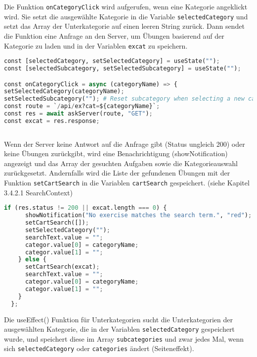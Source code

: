 Die Funktion \texttt{onCategoryClick} wird aufgerufen, wenn eine Kategorie angeklickt wird. Sie setzt die ausgewählte Kategorie in die Variable \texttt{selectedCategory} und setzt das Array der Unterkategorie auf einen leeren String zurück. Dann sendet die Funktion eine Anfrage an den Server, um Übungen basierend auf der Kategorie zu laden und in der Variablen \texttt{excat} zu speichern.

\begin{lstlisting}[language=Python]
const [selectedCategory, setSelectedCategory] = useState("");
const [selectedSubcategory, setSelectedSubcategory] = useState("");

const onCategoryClick = async (categoryName) => {
setSelectedCategory(categoryName);
setSelectedSubcategory(""); # Reset subcategory when selecting a new category
const route = `/api/ex?cat=${categoryName}`;
const res = await askServer(route, "GET");
const excat = res.response;
    
\end{lstlisting}

 Wenn der Server keine Antwort auf die Anfrage gibt (Status ungleich 200) oder keine Übungen zurückgibt, wird eine Benachrichtigung (showNotification) angezeigt und das Array der gesuchten Aufgaben sowie die Kategorieauswahl zurückgesetzt. Andernfalls wird die Liste der gefundenen Übungen mit der Funktion \texttt{setCartSearch} in die Variablen \texttt{cartSearch} gespeichert. (siehe Kapitel 3.4.2.1 SearchContext)

\newpage
\begin{lstlisting}[language=Python]
    if (res.status != 200 || excat.length === 0) {
      showNotification("No exercise matches the search term.", "red");
      setCartSearch([]);
      setSelectedCategory("");
      searchText.value = "";
      categor.value[0] = categoryName;
      categor.value[1] = "";
    } else {
      setCartSearch(excat);
      searchText.value = "";
      categor.value[0] = categoryName;
      categor.value[1] = "";
    }
  };


\end{lstlisting}



Die useEffect() Funktion für Unterkategorien sucht die Unterkategorien der ausgewählten Kategorie, die in der Variablen \texttt{selectedCategory} gespeichert wurde, und speichert diese im Array \texttt{subcategories} und zwar jedes Mal, wenn sich \texttt{selectedCategory} oder \texttt{categories} ändert (Seiteneffekt). 


